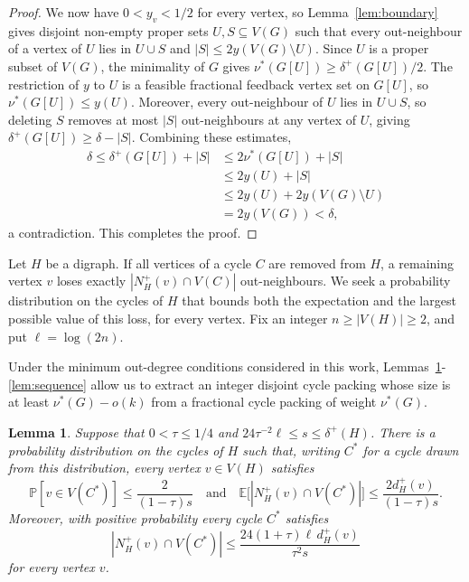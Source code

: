 \documentclass[a4paper,12pt]{article}
\newtheorem{lemma}[theorem]{Lemma}
\numberwithin{equation}{section}
\begin{document}
\begin{proof}
We now have $0<y_v<1/2$ for every vertex, so Lemma~\ref{lem:boundary}
gives disjoint non-empty proper sets $U,S\subseteq V(G)$ such that every
out-neighbour of a vertex of $U$ lies in $U\cup S$ and
$|S|\le2y(V(G)\setminus U)$.
Since $U$ is a proper subset of $V(G)$, the minimality of $G$ gives
$\nu^\ast(G[U])\ge\delta^+(G[U])/2$. The restriction of $y$ to $U$ is a
feasible fractional feedback vertex set on $G[U]$, so
$\nu^\ast(G[U])\le y(U)$. Moreover, every out-neighbour of $U$ lies in
$U\cup S$, so deleting $S$ removes at most $|S|$ out-neighbours at any
vertex of $U$, giving $\delta^+(G[U])\ge\delta-|S|$. Combining these
estimates,
$$
\begin{aligned}
\delta
\le\delta^+(G[U])+|S|&\le2\nu^\ast(G[U])+|S|\\
&\le2y(U)+|S|\\
&\le2y(U)+2y(V(G)\setminus U)\\
&=2y(V(G))<\delta,
\end{aligned}
$$
a contradiction. This completes the proof.
\end{proof}


Let $H$ be a digraph. If all vertices of a cycle 
$C$ are removed from $H$, a remaining vertex $v$ loses exactly 
$|N_H^+(v)\cap V(C)|$ out-neighbours. We seek a probability distribution on the cycles of $H$ 
that bounds both the expectation and the largest possible value of this 
loss, for every vertex.
Fix an integer $n\ge|V(H)|\ge2$, and put $\ell=\log(2n)$.

Under the minimum out-degree conditions considered in this work, Lemmas~\ref{lem:distribution}-\ref{lem:sequence} allow us to extract an integer disjoint cycle packing whose size is at least $\nu^{\ast}(G)-o(k)$ from a fractional cycle packing of weight $\nu^{\ast}(G)$.


\begin{lemma}\label{lem:distribution}
Suppose that $0<\tau\le1/4$ and
$24\tau^{-2}\ell\le s\le\delta^+(H)$.
There is a probability distribution on the cycles of $H$ such that,
writing $C^\ast$ for a cycle drawn from this distribution, every
vertex $v\in V(H)$ satisfies
$$
\mathbb P[v\in V(C^\ast)]\le\frac{2}{(1-\tau)s}
\quad\text{and}\quad
\mathbb E\bigl[|N_H^+(v)\cap V(C^\ast)|\bigr]
\le\frac{2d_H^+(v)}{(1-\tau)s}.
$$
Moreover, with positive probability  every cycle $C^\ast$ satisfies
$$
|N_H^+(v)\cap V(C^\ast)|
\le\frac{24(1+\tau)\ell\,d_H^+(v)}{\tau^2s}
$$
for every vertex $v$.
\end{lemma}
\end{document}
